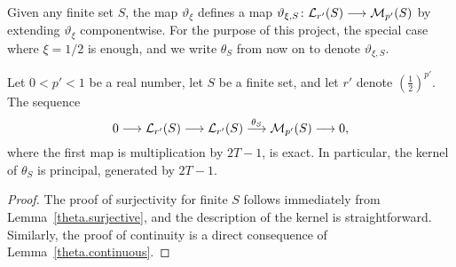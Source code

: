 Given any finite set $S$, the map $\vartheta_{\xi}$ defines a map $\vartheta_{\xi,S}\colon \mathcal L_{r'}(S)\longrightarrow \mathcal M_{p'}(S)$ by extending $\vartheta_{\xi}$ componentwise. For the purpose of this project, the special case where $\xi=1/2$ is enough, and we write $\theta_S$ from now on to denote $\vartheta_{\xi,S}$. 


\begin{theorem}
  \label{theta.exact_finite}
  \leanok
Let $0<p'<1$ be a real number, let $S$ be a finite set, and let $r'$ denote $\left(\frac{1}{2}\right)^{p'}$. The sequence
\[
0\longrightarrow\mathcal L_{r'}(S)\longrightarrow \mathcal L_{r'}(S)\overset{\theta_S}{\longrightarrow} \mathcal M_{p'}(S)\longrightarrow 0,
\]
where the first map is multiplication by $2T-1$, is exact. In particular, the kernel of $\theta_S$ is principal, generated by $2T-1$.%
\end{theorem}
\begin{proof}
  \leanok
The proof of surjectivity for finite $S$ follows immediately from Lemma~\ref{theta.surjective}, and the description of the kernel is straightforward. Similarly, the proof of continuity is a direct consequence of Lemma~\ref{theta.continuous}.
\end{proof}


